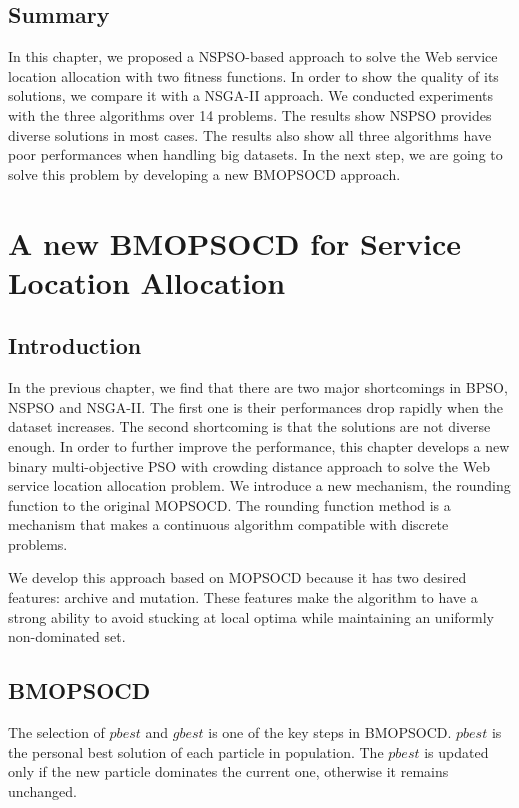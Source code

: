 \section{Summary}
In this chapter, we proposed a  NSPSO-based approach to solve the Web service location allocation with two fitness functions.
In order to show the quality of its solutions, we compare it with a NSGA-II approach.
We conducted experiments with the three algorithms over 14 problems.
The results show NSPSO provides diverse solutions in most cases. 
The results also show all three algorithms have poor performances when handling big datasets. 
In the next step, we are going to solve this problem by developing a new BMOPSOCD approach.

\chapter{A new BMOPSOCD for Service Location Allocation}
\label{C:bmopsocd}
\section{Introduction}
In the previous chapter, we find that there are two major shortcomings in BPSO, NSPSO and NSGA-II. The first one is
their performances drop rapidly when the dataset increases. The second shortcoming is that 
the solutions are not diverse enough. In order to further improve the performance, 
this chapter develops a new binary multi-objective PSO with crowding distance approach to solve the Web service location allocation problem. 
We introduce a new mechanism, the rounding function to the original MOPSOCD. The rounding function method is a mechanism
that makes a continuous algorithm compatible with discrete problems. 

We develop this approach based on MOPSOCD \cite{Raquel} because it has two desired features: archive and mutation. These features make the algorithm to have  a strong ability to avoid stucking at local optima while maintaining an 
uniformly non-dominated set. 



\section{BMOPSOCD}
The selection of $pbest$ and $gbest$ is one of the key steps in BMOPSOCD.
$pbest$ is the personal best solution of each particle in population. The $pbest$ is updated only if the new particle dominates the current one, otherwise it remains unchanged.

